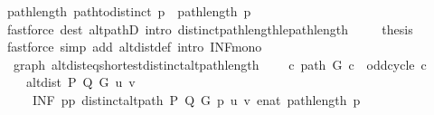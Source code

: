 \begin{isabellebody}
\ {\isachardoublequoteopen}path{\isacharunderscore}{\kern0pt}length\ {\isacharparenleft}{\kern0pt}path{\isacharunderscore}{\kern0pt}to{\isacharunderscore}{\kern0pt}distinct\ p{\isacharparenright}{\kern0pt}\ {\isasymle}\ path{\isacharunderscore}{\kern0pt}length\ p{\isachardoublequoteclose}\isanewline
\ \ \ \ \ \ \isamarkupfalse%
\ {\isacharparenleft}{\kern0pt}fastforce\ dest{\isacharcolon}{\kern0pt}\ alt{\isacharunderscore}{\kern0pt}pathD{\isacharparenleft}{\kern0pt}{}{\isacharparenright}{\kern0pt}\ intro{\isacharcolon}{\kern0pt}\ distinct{\isacharunderscore}{\kern0pt}path{\isacharunderscore}{\kern0pt}length{\isacharunderscore}{\kern0pt}le{\isacharunderscore}{\kern0pt}path{\isacharunderscore}{\kern0pt}length{\isacharparenright}{\kern0pt}\ \isacommand{{\isacharbraceright}{\kern0pt}}\isamarkupfalse%
\isanewline
\ \ \isamarkupfalse%
\ {\isacharquery}{\kern0pt}thesis\isanewline
\ \ \ \ \isamarkupfalse%
\ {\isacharparenleft}{\kern0pt}fastforce\ simp\ add{\isacharcolon}{\kern0pt}\ alt{\isacharunderscore}{\kern0pt}dist{\isacharunderscore}{\kern0pt}def\ intro{\isacharcolon}{\kern0pt}\ INF{\isacharunderscore}{\kern0pt}mono{\isacharparenright}{\kern0pt}\isanewline
{}\isamarkupfalse%
%
\endisatagproof
{\isafoldproof}%
%
\isadelimproof
\isanewline
%
\endisadelimproof
\isanewline
{}\isamarkupfalse%
\ {\isacharparenleft}{\kern0pt}\ graph{\isacharparenright}{\kern0pt}\ alt{\isacharunderscore}{\kern0pt}dist{\isacharunderscore}{\kern0pt}eq{\isacharunderscore}{\kern0pt}shortest{\isacharunderscore}{\kern0pt}distinct{\isacharunderscore}{\kern0pt}alt{\isacharunderscore}{\kern0pt}path{\isacharunderscore}{\kern0pt}length{\isacharcolon}{\kern0pt}\isanewline
\ \ \ {\isachardoublequoteopen}{\isasymnot}\ {\isacharparenleft}{\kern0pt}{\isasymexists}c{\isachardot}{\kern0pt}\ path\ G\ c\ {\isasymand}\ odd{\isacharunderscore}{\kern0pt}cycle\ c{\isacharparenright}{\kern0pt}{\isachardoublequoteclose}\isanewline
\ \ \isanewline
\ \ \ \ {\isachardoublequoteopen}alt{\isacharunderscore}{\kern0pt}dist\ P\ Q\ G\ u\ v\ {\isacharequal}{\kern0pt}\isanewline
\ \ \ \ \ {\isacharparenleft}{\kern0pt}INF\ p{\isasymin}{\isacharbraceleft}{\kern0pt}p{\isachardot}{\kern0pt}\ distinct{\isacharunderscore}{\kern0pt}alt{\isacharunderscore}{\kern0pt}path\ P\ Q\ G\ p\ u\ v{\isacharbraceright}{\kern0pt}{\isachardot}{\kern0pt}\ enat\ {\isacharparenleft}{\kern0pt}path{\isacharunderscore}{\kern0pt}length\ p{\isacharparenright}{\kern0pt}{\isacharparenright}{\kern0pt}{\isachardoublequoteclose}\isanewline

\end{isabellebody}

